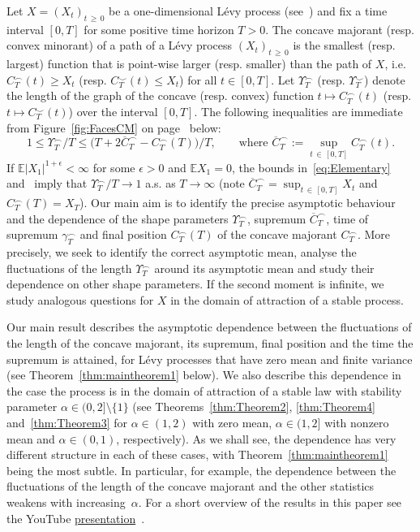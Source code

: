 \documentclass[AHL,Unicode,longabstracts,published]{cedram}
\newcommand\E{\mathds{E}}
\newcommand\1{\mathds{1}}
\newcommand\ov[1]{\overline{#1}}
\begin{document}
Let $X=(X_t)_{t\,\ge\,0}$ be a one-dimensional Lévy process (see~\cite[Definition~1.6, Chapter~1]{SatoBookLevy}) and fix a time interval $[0,T]$ for some positive time horizon $T>0$. The concave majorant (resp. convex minorant) of a path of a Lévy process $(X_t)_{t\,\geq\,0}$ is the smallest (resp. largest) function that is point-wise larger (resp. smaller) than the path of $X$, i.e. $C^{\frown}_T(t) \geq X_t$ (resp. $C^{\smile}_T(t) \leq X_t$) for all $t\in [0,T]$. Let $\Upsilon_T^{\frown}$ (resp. $\Upsilon_T^{\smile}$) denote the length of the graph of the concave (resp. convex) function $t\mapsto C^{\frown}_T(t)$ (resp. $t\mapsto C^{\smile}_T(t)$) over the interval $[0,T]$. The following inequalities are immediate from Figure~\ref{fig:FacesCM} on page~\pageref{page:Fig_2} below:
\begin{equation}\label{eq:Elementary}
1\le\Upsilon_T^{\frown}/T
\le\Big(T+2
\ov{C}^\frown_T- C^\frown_T(T)\Big)/T, \qquad\text{where }\ov{C}^\frown_T:=\sup_{t\,\in\,[0,T]}C^{\frown}_T(t).
\end{equation}
If $\E|X_1|^{1+\epsilon}<\infty$ for some $\epsilon>0$ and $\E X_1=0$, the bounds in~\eqref{eq:Elementary} and~\cite[Proposition~48.10]{SatoBookLevy} imply that $\Upsilon_T^{\frown}/T\to1$ a.s. as $T\to\infty$ (note $\ov{C}^\frown_T=\sup_{t\,\in\,[0,T]}X_t$ and $C^\frown_T(T)=X_T$). Our main aim is to identify the precise asymptotic behaviour and the dependence of the shape parameters $\Upsilon_T^\frown$, supremum $\ov{C}^\frown_T$, time of supremum $\gamma^\frown_T$ and final position $C^\frown_T(T)$ of the concave majorant $C^{\frown}_T$. More precisely, we seek to identify the correct asymptotic mean, analyse the fluctuations of the length $\Upsilon_T^\frown$ around its asymptotic mean and study their dependence on other shape parameters. If the second moment is infinite, we study analogous questions for $X$ in the domain of attraction of a stable process.

Our main result describes the asymptotic dependence between the fluctuations of the length of the concave majorant, its supremum, final position and the time the supremum is attained, for Lévy processes that have zero mean and finite variance (see Theorem~\ref{thm:maintheorem1} below). We also describe this dependence in the case the process is in the domain of attraction of a stable law with stability parameter $\alpha\in(0,2]\setminus\{1\}$ (see Theorems~\ref{thm:Theorem2}, \ref{thm:Theorem4} and~\ref{thm:Theorem3} for $\alpha\in(1,2)$ with zero mean, $\alpha\in(1,2]$ with nonzero mean and $\alpha\in(0,1)$, respectively). As we shall see, the dependence has very different structure in each of these cases, with Theorem~\ref{thm:maintheorem1} being the most subtle. In particular, for example, the dependence between the fluctuations of the length of the concave majorant and the other statistics weakens with increasing~$\alpha$. For a short overview of the results in this paper see the YouTube \href{https://youtu.be/b0AOJm-dE3g}{presentation}~\cite{Presentation_DB}.
\end{document}
